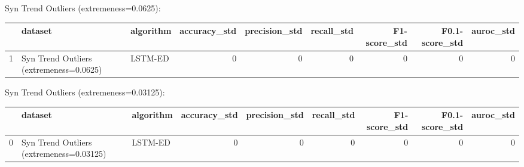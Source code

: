 Syn Trend Outliers (extremeness=0.0625):

\begin{tabular}{rllrrrrrr}
\hline
    & dataset                                 & algorithm   &   accuracy\_std &   precision\_std &   recall\_std &   F1-score\_std &   F0.1-score\_std &   auroc\_std \\
\hline
  1 & Syn Trend Outliers (extremeness=0.0625) & LSTM-ED     &              0 &               0 &            0 &              0 &                0 &           0 \\
\hline
\end{tabular}

Syn Trend Outliers (extremeness=0.03125):

\begin{tabular}{rllrrrrrr}
\hline
    & dataset                                  & algorithm   &   accuracy\_std &   precision\_std &   recall\_std &   F1-score\_std &   F0.1-score\_std &   auroc\_std \\
\hline
  0 & Syn Trend Outliers (extremeness=0.03125) & LSTM-ED     &              0 &               0 &            0 &              0 &                0 &           0 \\
\hline
\end{tabular}

